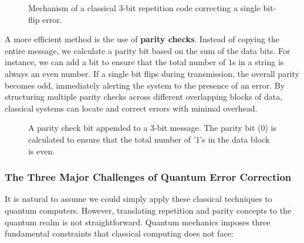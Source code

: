 \begin{figure}[hbt!]
\centering
\resizebox{\textwidth}{!}{
    
}
\caption[Mechanism of a classical 3-bit repetition code.]{Mechanism of a classical 3-bit repetition code correcting a single bit-flip error.}
\label{fig:1:classical_repetition}
\end{figure}

A more efficient method is the use of \textbf{parity checks}. Instead of copying the entire message, we calculate a parity bit based on the sum of the data bits. For instance, we can add a bit to ensure that the total number of $1$s in a string is always an even number. If a single bit flips during transmission, the overall parity becomes odd, immediately alerting the system to the presence of an error. By structuring multiple parity checks across different overlapping blocks of data, classical systems can locate and correct errors with minimal overhead.

\begin{figure}[hbt!]
\centering
    
\caption[A parity check bit appended to a 3-bit message.]{A parity check bit appended to a 3-bit message. The parity bit (0) is calculated to ensure that the total number of '1's in the data block is even.}
\label{fig:1:parity_check}
\end{figure}

\subsubsection*{The Three Major Challenges of Quantum Error Correction}

It is natural to assume we could simply apply these classical techniques to quantum computers. However, translating repetition and parity concepts to the quantum realm is not straightforward. Quantum mechanics imposes three fundamental constraints that classical computing does not face:

